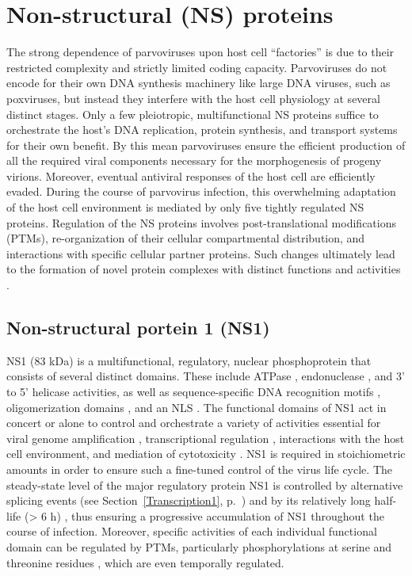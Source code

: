                 

\section{Non-structural (NS) proteins}
\label{NS}

The strong dependence of parvoviruses upon host cell “factories” is due to their restricted complexity and strictly limited coding capacity. Parvoviruses do not encode for their own DNA synthesis machinery like large DNA viruses, such as poxviruses, but instead they interfere with the host cell physiology at several distinct stages. Only a few pleiotropic, multifunctional NS proteins suffice to orchestrate the host’s DNA replication, protein synthesis, and transport systems for their own benefit. By this mean parvoviruses ensure the efficient production of all the required viral components necessary for the morphogenesis of progeny virions. Moreover, eventual antiviral responses of the host cell are efficiently evaded. During the course of parvovirus infection, this overwhelming adaptation of the host cell environment is mediated by only five tightly regulated NS proteins. Regulation of the NS proteins involves post-translational modifications (PTMs), re-organization of their cellular compartmental distribution, and interactions with specific cellular partner proteins. Such changes ultimately lead to the formation of novel protein complexes with distinct functions and activities \cite{NS}.        


\subsection{Non-structural portein 1 (NS1)}
\label{NS1}
NS1 (83 kDa) is a multifunctional, regulatory, nuclear phosphoprotein that consists of several distinct domains. These include ATPase \cite{pmid1833878}, endonuclease \cite{pmid12050365, pmid2527311, pmid7747462, pmid9349487}, and 3' to 5' helicase \cite{pmid8106366} activities, as well as sequence-specific DNA recognition motifs \cite{pmid9813208, pmid7853501, pmid17898054}, oligomerization domains \cite{pmid9311818}, and an NLS \cite{pmid8372437}. The functional domains of NS1 act in concert or alone to control and orchestrate a variety of activities essential for viral genome amplification \cite{pmid1388310, pmid8437230, pmid8076610}, transcriptional regulation \cite{pmid3171551, pmid1830114, pmid9454706}, interactions with the host cell environment, and mediation of cytotoxicity \cite{pmid2137660, pmid2167840, pmid1388209, pmid2144594}. NS1 is required in stoichiometric amounts in order to ensure such a fine-tuned control of the virus life cycle. The steady-state level of the major regulatory protein NS1 is controlled by alternative splicing events (see Section~\ref{Transcription1}, p.~\pageref{Transcription1}) and by its relatively long half-life (> 6 h) \cite{pmid2142555, pmid11437668}, thus ensuring  a progressive accumulation of NS1 throughout the course of infection. Moreover, specific activities of each individual functional domain can be regulated by PTMs, particularly phosphorylations at serine and threonine residues \cite{pmid4020958, pmid3739422}, which are even temporally regulated.

